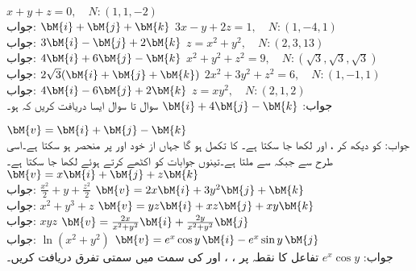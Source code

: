 \quad
$x+y+z=0,\quad N:(1,1,-2)$\\
جواب:\quad
$\bM{i}+\bM{j}+\bM{k}$
\quad
$3x-y+2z=1,\quad N:(1,-4,1)$\\
جواب:\quad
$3\bM{i}-\bM{j}+2\bM{k}$
\quad
$z=x^2+y^2,\quad N:(2,3,13)$\\
جواب:\quad
$4\bM{i}+6\bM{j}-\bM{k}$
\quad
$x^2+y^2+z^2=9,\quad N:(\sqrt{3},\sqrt{3},\sqrt{3})$\\
جواب:\quad
$2\sqrt{3}(\bM{i}+\bM{j}+\bM{k})$
\quad
$2x^2+3y^2+z^2=6,\quad N:(1,-1,1)$\\
جواب:\quad
$4\bM{i}-6\bM{j}+2\bM{k}$
\quad
$z=xy^2,\quad N:(2,1,2)$\\
جواب:\quad
$\bM{i}+4\bM{j}-\bM{k}$
سوال  تا سوال  ایسا  دریافت کریں کہ  ہو۔

\quad
$\bM{v}=\bM{i}+\bM{j}-\bM{k}$\\
جواب: کو دیکھ کر ،  اور
  لکھا جا سکتا ہے۔  کا تکمل  ہو گا جہاں  از خود  اور  پر منحصر ہو سکتا ہے۔اسی طرح  سے  جبکہ    سے  ملتا ہے۔تینوں جوابات کو اکٹھے کرتے ہوئے  لکھا جا سکتا ہے۔
\quad
$\bM{v}=x\bM{i}+\bM{j}+z\bM{k}$\\
جواب:\quad
$\tfrac{x^2}{2}+y+\tfrac{z^2}{2}$
\quad
$\bM{v}=2x\bM{i}+3y^2\bM{j}+\bM{k}$\\
جواب:\quad
$x^2+y^3+z$
\quad
$\bM{v}=yz\bM{i}+xz\bM{j}+xy\bM{k}$\\
جواب:\quad
$xyz$
\quad
$\bM{v}=\frac{2x}{x^2+y^2}\bM{i}+\frac{2y}{x^2+y^2}\bM{j}$\\
جواب:\quad
$\ln (x^2+y^2)$
\quad
$\bM{v}=e^x\cos y \,\bM{i}-e^x\sin y\,\bM{j}$\\
جواب:\quad
$e^x\cos y$
\quad 
تفاعل  کا نقطہ  پر ، ،  اور  کی سمت میں سمتی تفرق دریافت کریں۔

